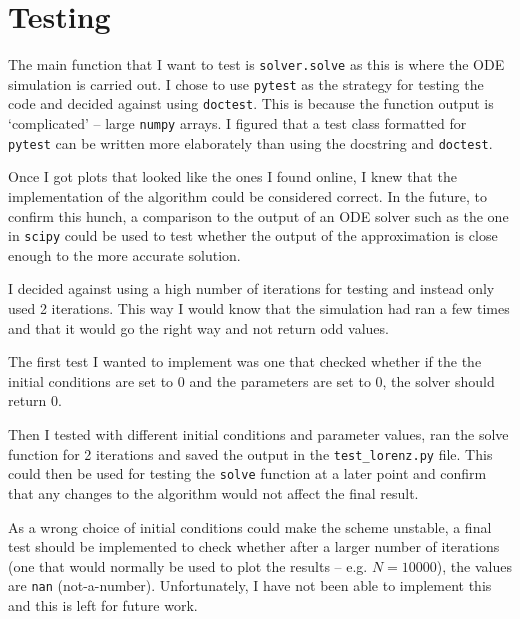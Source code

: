 \documentclass{article}
\def\code#1{\texttt{#1}}
\begin{document}
\section{Testing}
The main function that I want to test is \code{solver.solve} as this is where the ODE simulation is carried out. I chose to use \code{pytest} as the strategy for testing the code and decided against using \code{doctest}. This is because the function output is `complicated' -- large \code{numpy} arrays. I figured that a test class formatted for \code{pytest} can be written more elaborately than using the docstring and \code{doctest}.

Once I got plots that looked like the ones I found online, I knew that the implementation of the algorithm could be considered correct. In the future, to confirm this hunch, a comparison to the output of an ODE solver such as the one in \code{scipy} could be used to test whether the output of the approximation is close enough to the more accurate solution.

I decided against using a high number of iterations for testing and instead only used 2 iterations. This way I would know that the simulation had ran a few times and that it would go the right way and not return odd values. 

The first test I wanted to implement was one that checked whether if the the initial conditions are set to $0$ and the parameters are set to $0$, the solver should return $0$.

Then I tested with different initial conditions and parameter values, ran the solve function for 2 iterations and saved the output in the \code{test\_lorenz.py} file. This could then be used for testing the \code{solve} function at a later point and confirm that any changes to the algorithm would not affect the final result. 

As a wrong choice of initial conditions could make the scheme unstable, a final test should be implemented to check whether after a larger number of iterations (one that would normally be used to plot the results -- e.g. $N = 10000$), the values are \code{nan} (not-a-number). Unfortunately, I have not been able to implement this and this is left for future work. 



\end{document}
